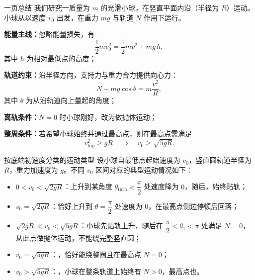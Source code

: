 \documentclass[a4paper,11pt]{ctexart}
\begin{document}
\begin{summarybox}{一页总结}
  我们研究一质量为 $m$ 的光滑小球，在竖直平面内沿（半径为 $R$）运动。小球从以速度 $v_0$ 出发，在重力 $mg$ 与轨道 $N$ 作用下运行。
  \begin{focuspoints}
    \item \textbf{能量主线：}忽略能量损失，有
          \[
            \frac12 m v_0^2 = \frac12 m v^2 + mg\,h,
          \]
          其中 $h$ 为相对最低点的高度；
    \item \textbf{轨道约束：}沿半径方向，支持力与重力合力提供向心力：
          \[
            N - mg\cos\theta = m\frac{v^2}{R},
          \]
          其中 $\theta$ 为从沿轨道向上量起的角度；
    \item \textbf{离轨条件：}$N=0$ 时小球刚好，改为做抛体运动；
    \item \textbf{整周条件：}若希望小球始终并通过最高点，则在最高点需满足
          \[
            v_{\text{top}}^2 \ge gR
            \quad\Longrightarrow\quad
            v_0 \ge \sqrt{5gR}.
          \]
  \end{focuspoints}
\end{summarybox}

\begin{summarybox}{按底端初速度分类的运动类型}
  设小球自最低点起始速度为 $v_0$，竖直圆轨道半径为 $R$，重力加速度为 $g$。不同 $v_0$ 区间对应的典型运动情况如下：
  \begin{itemize}
    \item $0 < v_0 < \sqrt{2gR}$：上升到某角度 $\theta_{\text{turn}} < \dfrac{\pi}{2}$ 处速度降为 $0$，随后，始终贴轨；
    \item $v_0 = \sqrt{2gR}$：恰好上升到 $\theta = \dfrac{\pi}{2}$ 处速度为 $0$，在最高点侧边停顿后回落；
    \item $\sqrt{2gR} < v_0 < \sqrt{5gR}$：小球先贴轨上升，随后在 $\dfrac{\pi}{2} < \theta_1 < \pi$ 处满足 $N=0$，从此点做抛体运动，不能绕完整竖直圆；
    \item $v_0 = \sqrt{5gR}$：，恰好能绕整圈且在最高点 $N=0$；
    \item $v_0 > \sqrt{5gR}$：，小球在整条轨道上始终有 $N>0$，最高点也。
  \end{itemize}
\end{summarybox}
\end{document}
